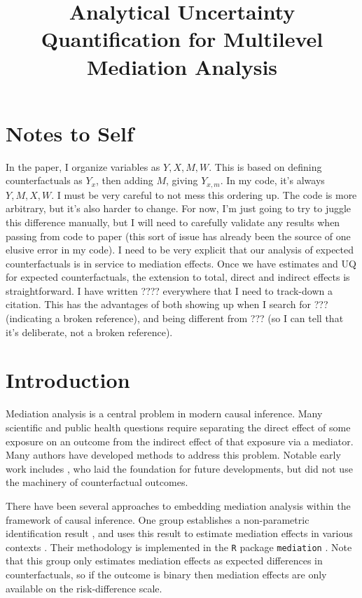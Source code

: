 \documentclass{article}
\title{Analytical Uncertainty Quantification for Multilevel Mediation Analysis}
\begin{document}
\maketitle
\section{Notes to Self}
\begin{outline}
    \1 In the paper, I organize variables as $Y, X, M, W$. This is based on defining counterfactuals as $Y_x$, then adding $M$, giving $Y_{x, m}$. In my code, it's always $Y, M, X, W$. I must be very careful to not mess this ordering up. The code is more arbitrary, but it's also harder to change. For now, I'm just going to try to juggle this difference manually, but I will need to carefully validate any results when passing from code to paper (this sort of issue has already been the source of one elusive error in my code).
    \1 I need to be very explicit that our analysis of expected counterfactuals is in service to mediation effects. Once we have estimates and UQ for expected counterfactuals, the extension to total, direct and indirect effects is straightforward.
    \1 I have written ???? everywhere that I need to track-down a citation. This has the advantages of both showing up when I search for ??? (indicating a broken reference), and being different from ??? (so I can tell that it's deliberate, not a broken reference).
\end{outline}



\section{Introduction}

Mediation analysis is a central problem in modern causal inference. Many scientific and public health questions require separating the direct effect of some exposure on an outcome from the indirect effect of that exposure via a mediator. Many authors have developed methods to address this problem. Notable early work includes \citet{Bar86}, who laid the foundation for future developments, but did not use the machinery of counterfactual outcomes. 

There have been several approaches to embedding mediation analysis within the framework of causal inference. One group establishes a non-parametric identification result \citep{Ima10II}, and uses this result to estimate mediation effects in various contexts \citep{Ima10I, Ima11}. Their methodology is implemented in the \texttt{R} package \texttt{mediation} \citep{Tin14}. Note that this group only estimates mediation effects as expected differences in counterfactuals, so if the outcome is binary then mediation effects are only available on the risk-difference scale.
\end{document}
